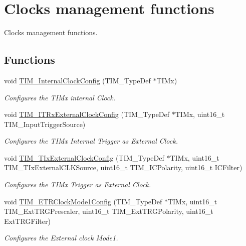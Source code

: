 \hypertarget{group___t_i_m___group6}{\section{Clocks management functions}
\label{group___t_i_m___group6}
}


Clocks management functions.  


\subsection*{Functions}
\begin{DoxyCompactItemize}
\item 
void \hyperlink{group___t_i_m___group6_ga2394f0221709c0659874f9a4184cf86e}{T\-I\-M\-\_\-\-Internal\-Clock\-Config} (T\-I\-M\-\_\-\-Type\-Def $\ast$T\-I\-Mx)
\begin{DoxyCompactList}\small\item\em Configures the T\-I\-Mx internal Clock. \end{DoxyCompactList}\item 
void \hyperlink{group___t_i_m___group6_gabef227d21d9e121e6a4ec5ab6223f5a9}{T\-I\-M\-\_\-\-I\-T\-Rx\-External\-Clock\-Config} (T\-I\-M\-\_\-\-Type\-Def $\ast$T\-I\-Mx, uint16\-\_\-t T\-I\-M\-\_\-\-Input\-Trigger\-Source)
\begin{DoxyCompactList}\small\item\em Configures the T\-I\-Mx Internal Trigger as External Clock. \end{DoxyCompactList}\item 
void \hyperlink{group___t_i_m___group6_gaf460e7d9c9969044e364130e209937fc}{T\-I\-M\-\_\-\-T\-Ix\-External\-Clock\-Config} (T\-I\-M\-\_\-\-Type\-Def $\ast$T\-I\-Mx, uint16\-\_\-t T\-I\-M\-\_\-\-T\-Ix\-External\-C\-L\-K\-Source, uint16\-\_\-t T\-I\-M\-\_\-\-I\-C\-Polarity, uint16\-\_\-t I\-C\-Filter)
\begin{DoxyCompactList}\small\item\em Configures the T\-I\-Mx Trigger as External Clock. \end{DoxyCompactList}\item 
void \hyperlink{group___t_i_m___group6_ga47c05638b93aabcd641dbc8859e1b2df}{T\-I\-M\-\_\-\-E\-T\-R\-Clock\-Mode1\-Config} (T\-I\-M\-\_\-\-Type\-Def $\ast$T\-I\-Mx, uint16\-\_\-t T\-I\-M\-\_\-\-Ext\-T\-R\-G\-Prescaler, uint16\-\_\-t T\-I\-M\-\_\-\-Ext\-T\-R\-G\-Polarity, uint16\-\_\-t Ext\-T\-R\-G\-Filter)
\begin{DoxyCompactList}\small\item\em Configures the External clock Mode1. \end{DoxyCompactList}\item 

\end{DoxyCompactItemize}

